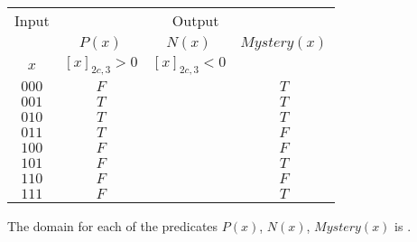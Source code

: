 \begin{center}
    \begin{tabular}{c||c|c|c}
    Input & \multicolumn{3}{c}{Output} \\
    &$P(x)$ & $N(x)$ & $Mystery(x)$\\
    $x$ & $[x]_{2c,3} > 0$ & $[x]_{2c,3} < 0$& \\
    \hline
    $000$  & $F$ & & $T$\\
    $001$  & $T$ & & $T$\\
    $010$  & $T$ & & $T$\\
    $011$  & $T$ & & $F$\\
    $100$  & $F$ & & $F$\\
    $101$  & $F$ & & $T$\\
    $110$  & $F$ & & $F$\\
    $111$  & $F$ & & $T$\\
    \end{tabular}
    \end{center}
    
    The domain for each of the predicates $P(x)$, $N(x)$, $Mystery(x)$ is
    \underline{}.
    